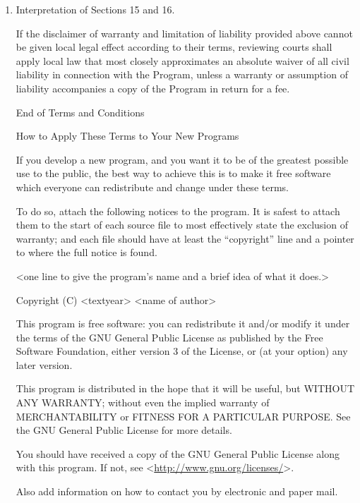 \begin{enumerate}
\item Interpretation of Sections 15 and 16.

If the disclaimer of warranty and limitation of liability provided
above cannot be given local legal effect according to their terms,
reviewing courts shall apply local law that most closely approximates
an absolute waiver of all civil liability in connection with the
Program, unless a warranty or assumption of liability accompanies a
copy of the Program in return for a fee.

\begin{center}
  \Large \sc End of Terms and Conditions
\end{center}

\clearpage  %

\begin{center}
  \Large \sc How to Apply These Terms to Your New Programs
\end{center}

If you develop a new program, and you want it to be of the greatest
possible use to the public, the best way to achieve this is to make it
free software which everyone can redistribute and change under these terms.

To do so, attach the following notices to the program.  It is safest
to attach them to the start of each source file to most effectively
state the exclusion of warranty; and each file should have at least
the ``copyright'' line and a pointer to where the full notice is found.

{\footnotesize\ttfamily
<one line to give the program's name and a brief idea of what it does.>

Copyright (C) <textyear>  <name of author>

This program is free software: you can redistribute it and/or modify
it under the terms of the GNU General Public License as published by
the Free Software Foundation, either version 3 of the License, or
(at your option) any later version.

This program is distributed in the hope that it will be useful,
but WITHOUT ANY WARRANTY; without even the implied warranty of
MERCHANTABILITY or FITNESS FOR A PARTICULAR PURPOSE.  See the
GNU General Public License for more details.

You should have received a copy of the GNU General Public License
along with this program.  If not, see <\url{http://www.gnu.org/licenses/}>.
}

Also add information on how to contact you by electronic and paper mail.


\end{enumerate}

